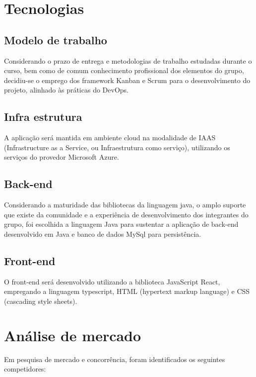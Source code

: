 \documentclass[
    12pt,               %
    openright,          %
    oneside,
    a4paper,            %
    english,            %
    brazil              %
   ]{ifsp-spo-inf-ctds}
\begin{document}
\chapter[Tecnologias]{Tecnologias}

	\section{Modelo de trabalho}
	
	Considerando o prazo de entrega e metodologias de trabalho estudadas durante o curso, bem como de comum conhecimento profissional dos elementos do grupo, decidiu-se o emprego dos framework Kanban e Scrum para o desenvolvimento do projeto, alinhado {\`a}s práticas do DevOps.

	\section{Infra estrutura}
	
	A aplica{\c{c}}ão será mantida em ambiente cloud na modalidade de IAAS (Infrastructure as a Service, ou Infraestrutura como servi{\c{c}}o), utilizando os servi{\c{c}}os do provedor Microsoft Azure.
	
	\section{Back-end}
	
	Considerando a maturidade das bibliotecas da linguagem java, o amplo suporte que existe da comunidade e a experiência de desenvolvimento dos integrantes do grupo, foi escolhida a linguagem Java para sustentar a aplica{\c{c}}ão de back-end desenvolvido em Java e banco de dados MySql para persistência.
	
	\section{Front-end}
	
	O front-end será desenvolvido utilizando a biblioteca JavaScript React, empregando a linguagem typescript, HTML (hypertext markup language) e CSS (cascading style sheets).
	
\chapter[Análise de mercado]{Análise de mercado}

    Em pesquisa de mercado e concorrência, foram identificados os seguintes competidores:
    
\end{document}
